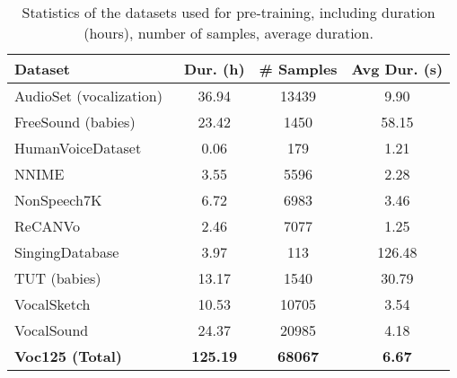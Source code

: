 \begin{table}[]
\caption{Statistics of the datasets used for pre-training, including duration (hours), number of samples, average duration.}
\label{table:pretraining_datasets}
\centering
\begin{tabular}{llccc}
\toprule
\multicolumn{2}{l}{\textbf{Dataset}} & \textbf{Dur. (h)} & \textbf{\# Samples} & \textbf{Avg Dur. (s)} \\
\midrule
\multicolumn{2}{l}{AudioSet (vocalization)~\cite{audioset}} 
    & 36.94 
    & 13439 
    & 9.90   \\
\multicolumn{2}{l}{FreeSound (babies)~\cite{freesound}}      
    & 23.42 
    & 1450
    & 58.15  \\
\multicolumn{2}{l}{HumanVoiceDataset}       
    & 0.06  
    & 179 
    & 1.21   \\
\multicolumn{2}{l}{NNIME~\cite{nnime}}                  
    & 3.55  
    & 5596 
    & 2.28   \\
\multicolumn{2}{l}{NonSpeech7K~\cite{nonspeech7k}}             
    & 6.72 
    & 6983 
    & 3.46   \\
\multicolumn{2}{l}{ReCANVo~\cite{recanvo}}                 
    & 2.46 
    & 7077 
    & 1.25   \\
\multicolumn{2}{l}{SingingDatabase~\cite{singingdatabase}}         
    & 3.97 
    & 113 
    & 126.48 \\
\multicolumn{2}{l}{TUT (babies)~\cite{tut}}            
    & 13.17 
    & 1540 
    & 30.79  \\
\multicolumn{2}{l}{VocalSketch~\cite{vocalsketch}}             
    & 10.53 
    & 10705 
    & 3.54 \\
\multicolumn{2}{l}{VocalSound~\cite{vocalsound}}              
    & 24.37 
    & 20985 
    & 4.18   \\ \midrule
\multicolumn{2}{l}{\textbf{Voc125 (Total)}}          
    & \textbf{125.19} 
    & \textbf{68067} 
    & \textbf{6.67} \\
\bottomrule
\end{tabular}
\end{table}